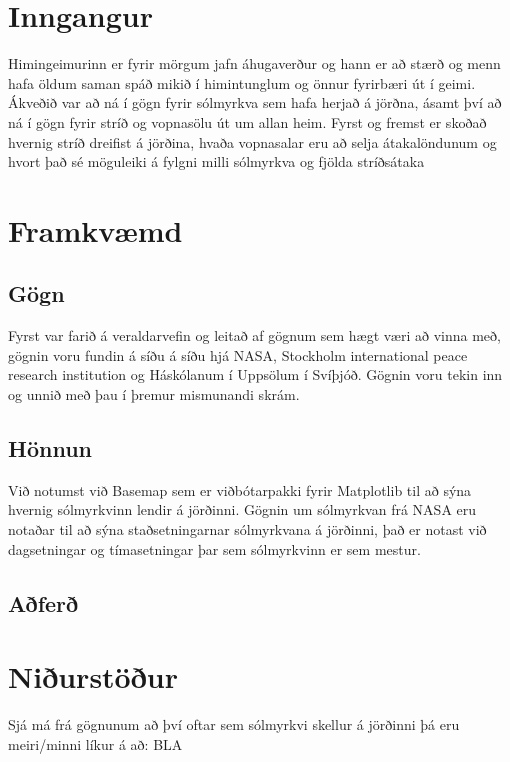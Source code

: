 \documentclass[12pt, git, final]{rureport}
\begin{document}
\maketitle  %


%
\section{Inngangur} %
Himingeimurinn er fyrir mörgum jafn áhugaverður og hann er að stærð og menn hafa öldum saman spáð mikið í himintunglum og önnur fyrirbæri út í geimi. Ákveðið var að ná í gögn fyrir sólmyrkva sem hafa herjað á jörðna, ásamt því að ná í gögn fyrir stríð og vopnasölu út um allan heim. Fyrst og fremst er skoðað hvernig stríð dreifist á jörðina, hvaða vopnasalar eru að selja átakalöndunum og hvort það sé möguleiki á fylgni milli sólmyrkva og fjölda stríðsátaka
\section{Framkvæmd}
\subsection{Gögn}
Fyrst var farið á veraldarvefin og leitað af gögnum sem hægt væri að vinna með, gögnin voru fundin á síðu á síðu hjá NASA\cite{Eclipse}, Stockholm international peace research institution\cite{weapon} og Háskólanum í Uppsölum í Svíþjóð\cite{conflict}. Gögnin voru tekin inn og unnið með þau í þremur mismunandi skrám.
\subsection{Hönnun}
Við notumst við Basemap sem er viðbótarpakki fyrir Matplotlib til að sýna hvernig sólmyrkvinn lendir á jörðinni. Gögnin um sólmyrkvan frá NASA eru notaðar til að sýna staðsetningarnar sólmyrkvana á jörðinni, það er notast við dagsetningar og tímasetningar þar sem sólmyrkvinn er sem mestur. 
\subsection{Aðferð}
%
\section{Niðurstöður}\label{nidurstodur}
Sjá má frá gögnunum að því oftar sem sólmyrkvi skellur á  jörðinni þá eru meiri/minni líkur á að: BLA



\pagebreak


\clearpage
\printbibliography
\end{document}
